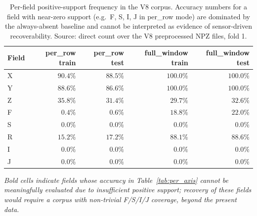 \begin{table}[H]
\centering
\caption{Per-field positive-support frequency in the V8 corpus. Accuracy numbers for a field with near-zero support (e.g.\ F, S, I, J in per\_row mode) are dominated by the always-absent baseline and cannot be interpreted as evidence of sensor-driven recoverability. Source: direct count over the V8 preprocessed NPZ files, fold 1.}
\label{tab:data_coverage}
\begin{tabular}{l r r r r}
\toprule
Field & per\_row train & per\_row test & full\_window train & full\_window test \\
\midrule
X  & $90.4\%$           & $88.5\%$           & $100.0\%$          & $100.0\%$          \\
Y  & $88.6\%$           & $86.6\%$           & $100.0\%$          & $100.0\%$          \\
Z  & $35.8\%$           & $31.4\%$           & $29.7\%$           & $32.6\%$           \\
F  & $\mathbf{0.4\%}$   & $\mathbf{0.6\%}$   & $18.8\%$           & $22.0\%$           \\
S  & $\mathbf{0.0\%}$   & $\mathbf{0.0\%}$   & $\mathbf{0.0\%}$   & $\mathbf{0.0\%}$   \\
R  & $15.2\%$           & $17.2\%$           & $88.1\%$           & $88.6\%$           \\
I  & $\mathbf{0.0\%}$   & $\mathbf{0.0\%}$   & $\mathbf{0.0\%}$   & $\mathbf{0.0\%}$   \\
J  & $\mathbf{0.0\%}$   & $\mathbf{0.0\%}$   & $\mathbf{0.0\%}$   & $\mathbf{0.0\%}$   \\
\bottomrule
\end{tabular}
\par\smallskip
\footnotesize\textit{Bold cells indicate fields whose accuracy in Table~\ref{tab:per_axis} cannot be meaningfully evaluated due to insufficient positive support; recovery of these fields would require a corpus with non-trivial F/S/I/J coverage, beyond the present data.}
\end{table}
